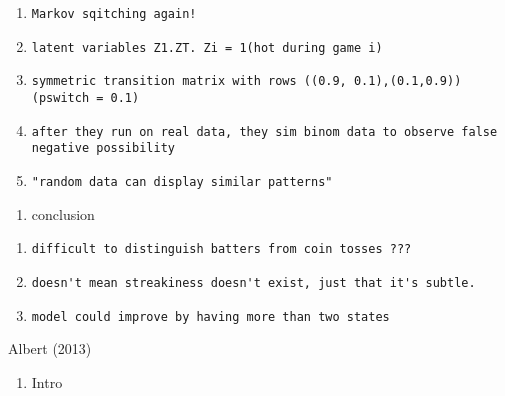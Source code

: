 \documentclass[12pt,twoside]{dukestatscithesis}
\providecommand{\tightlist}{%
  \setlength{\itemsep}{0pt}\setlength{\parskip}{0pt}}
\theoremstyle{definition}
\theoremstyle{definition}
\theoremstyle{definition}
\theoremstyle{remark}
\begin{document}
\begin{enumerate}
\def\labelenumi{\arabic{enumi}.}
\item
\begin{verbatim}
Markov sqitching again!
\end{verbatim}
\item
\begin{verbatim}
latent variables Z1.ZT. Zi = 1(hot during game i)
\end{verbatim}
\item
\begin{verbatim}
symmetric transition matrix with rows ((0.9, 0.1),(0.1,0.9)) (pswitch = 0.1)
\end{verbatim}
\item
\begin{verbatim}
after they run on real data, they sim binom data to observe false negative possibility
\end{verbatim}
\item
\begin{verbatim}
"random data can display similar patterns"
\end{verbatim}
\end{enumerate}
\begin{enumerate}
\def\labelenumi{\Alph{enumi}.}
\setcounter{enumi}{4}
\tightlist
\item
  conclusion
\end{enumerate}
\begin{enumerate}
\def\labelenumi{\arabic{enumi}.}
\item
\begin{verbatim}
difficult to distinguish batters from coin tosses ???
\end{verbatim}
\item
\begin{verbatim}
doesn't mean streakiness doesn't exist, just that it's subtle.
\end{verbatim}
\item
\begin{verbatim}
model could improve by having more than two states
\end{verbatim}
\end{enumerate}
Albert (2013)
\begin{enumerate}
\def\labelenumi{\Alph{enumi}.}
\tightlist
\item
  Intro
\end{enumerate}
\end{document}

